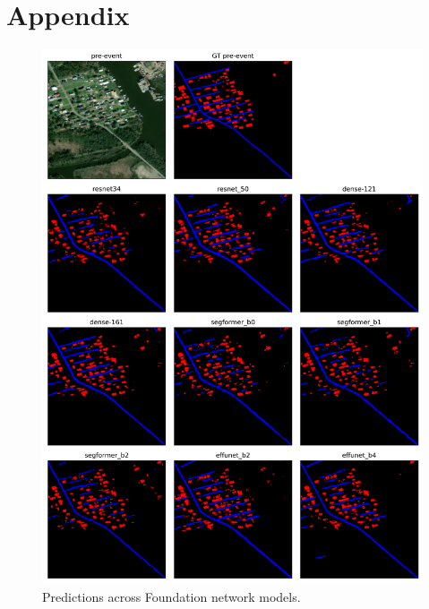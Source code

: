 \documentclass[10pt,twocolumn,letterpaper]{article}
\begin{document}




{\small


}

\section{Appendix}
\label{sec:appendices}

\clearpage
\begin{figure}[t]
  \centering
   \includegraphics[width=2\linewidth]{final-report/figures/sample_images_foundation_0.png}
   \caption{Predictions across Foundation network models.}
   \label{fig:sample_images_foundation_0}
\end{figure}
\end{document}
